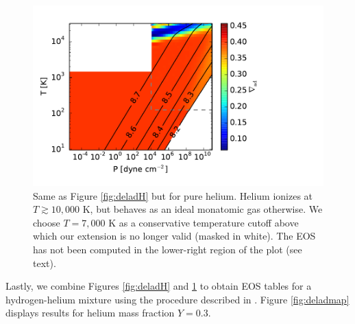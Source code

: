 \begin{figure}[H]
\centering
\includegraphics[scale=.7]{figures/delad_S_He.pdf}
\caption{Same as Figure \ref{fig:deladH} but for pure helium. Helium ionizes at $T \gtrsim 10,000$ K, but behaves as an ideal monatomic gas otherwise. We choose $T=7,000$ K as a conservative temperature cutoff above which our  extension is no longer valid (masked in white). The EOS has not been computed in the lower-right region of the plot (see text).}
\label{fig:deladHe}
\end{figure}

\vspace{0.2in}

Lastly, we combine Figures \ref{fig:deladH} and \ref{fig:deladHe} to obtain EOS tables for a hydrogen-helium mixture using the procedure described in \citet{saumon95}.  Figure \ref{fig:deladmap} displays results for helium mass fraction $Y=0.3$.


